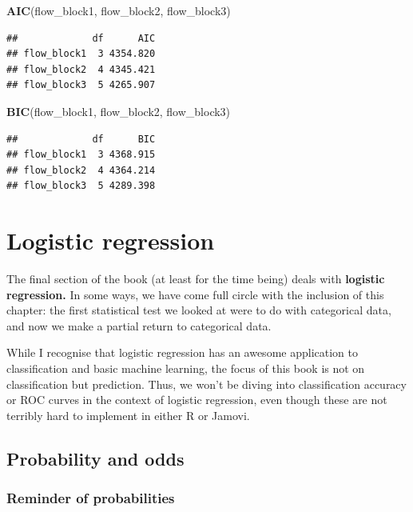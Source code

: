 \documentclass[
]{book}
\newenvironment{Shaded}{\begin{snugshade}}{\end{snugshade}}
\newcommand{\FunctionTok}[1]{\textcolor[rgb]{0.13,0.29,0.53}{\textbf{#1}}}
\newcommand{\NormalTok}[1]{#1}
\begin{document}
\begin{Shaded}
\begin{Highlighting}[]
\FunctionTok{AIC}\NormalTok{(flow\_block1, flow\_block2, flow\_block3)}
\end{Highlighting}
\end{Shaded}

\begin{verbatim}
##             df      AIC
## flow_block1  3 4354.820
## flow_block2  4 4345.421
## flow_block3  5 4265.907
\end{verbatim}

\begin{Shaded}
\begin{Highlighting}[]
\FunctionTok{BIC}\NormalTok{(flow\_block1, flow\_block2, flow\_block3)}
\end{Highlighting}
\end{Shaded}

\begin{verbatim}
##             df      BIC
## flow_block1  3 4368.915
## flow_block2  4 4364.214
## flow_block3  5 4289.398
\end{verbatim}

\hypertarget{logistic-regression}{%
\chapter{Logistic regression}\label{logistic-regression}}

The final section of the book (at least for the time being) deals with \textbf{logistic regression.} In some ways, we have come full circle with the inclusion of this chapter: the first statistical test we looked at were to do with categorical data, and now we make a partial return to categorical data.

While I recognise that logistic regression has an awesome application to classification and basic machine learning, the focus of this book is not on classification but prediction. Thus, we won't be diving into classification accuracy or ROC curves in the context of logistic regression, even though these are not terribly hard to implement in either R or Jamovi.

\hypertarget{probability-and-odds}{%
\section{Probability and odds}\label{probability-and-odds}}

\hypertarget{reminder-of-probabilities}{%
\subsection{Reminder of probabilities}\label{reminder-of-probabilities}}
\end{document}
